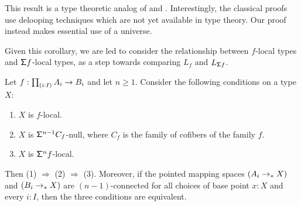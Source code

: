 This result is a type theoretic analog of \cite[Theorem 3.1]{Bousfield} and \cite[3.A.1]{Farjoun}.
Interestingly, the classical proofs use delooping techniques which are not yet available in type theory.
Our proof instead makes essential use of a universe.

Given this corollary, we are led to consider the relationship between $f$-local types and $\mathsf{\Sigma} f$-local types, as a step towards comparing $L_f$ and $L_{\mathsf{\Sigma} f}$.

\begin{thm}\label{theorem:characterizinglocalness}
    Let $f: \prd{i:I} A_i \to B_i$ and let $n \geq 1$.
    Consider the following conditions on a type $X$:
    \begin{enumerate}
    \item $X$ is $f$-local.
    \item $X$ is $\mathsf{\Sigma}^{n-1} C_f$-null,
    where $C_f$ is the family of cofibers of the family $f$. 
    \item $X$ is $\mathsf{\Sigma}^{n} f$-local.
    \end{enumerate}
    Then (1) $\Rightarrow$ (2) $\Rightarrow$ (3).
    Moreover, if the pointed mapping spaces $(A_i \to_{\ast} X)$ and $(B_i \to_{\ast} X)$
    are $(n-1)$-connected for all choices of base point $x : X$
    and every $i : I$,
    then the three conditions are equivalent.
\end{thm}

